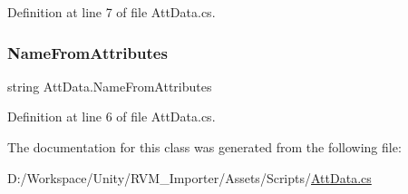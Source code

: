 Definition at line 7 of file Att\+Data.\+cs.

\mbox{\label{class_att_data_a502d563e2461a3f13f9ce28e54cdcea7}} 
\subsubsection{\texorpdfstring{NameFromAttributes}{NameFromAttributes}}
{\footnotesize\ttfamily string Att\+Data.\+Name\+From\+Attributes}



Definition at line 6 of file Att\+Data.\+cs.



The documentation for this class was generated from the following file\+:\begin{DoxyCompactItemize}
\item 
D\+:/\+Workspace/\+Unity/\+R\+V\+M\+\_\+\+Importer/\+Assets/\+Scripts/\mbox{\hyperlink{_att_data_8cs}{Att\+Data.\+cs}}\end{DoxyCompactItemize}
